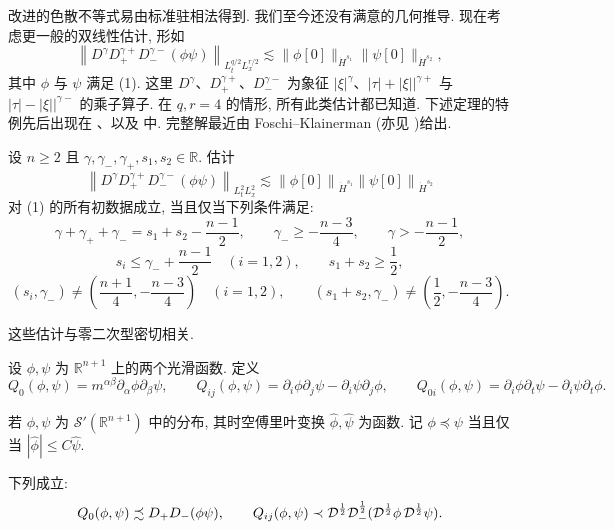改进的色散不等式易由标准驻相法得到. 我们至今还没有满意的几何推导.
现在考虑更一般的双线性估计, 形如
\[
\left\|D^{\gamma}D_{+}^{\gamma+}D_{-}^{\gamma-}\left(\phi\psi\right)\right\|_{L_{t}^{q/2}L_{x}^{r/2}}\lesssim\|\phi[0]\|_{\dot{H}^{s_{1}}}\|\psi[0]\|_{\dot{H}^{s_{2}}},
\]
其中 $\phi$ 与 $\psi$ 满足 (1). 这里 $D^\gamma$、$D_{+}^{\gamma+}$、$D_{-}^{\gamma-}$ 为象征 $|\xi|^\gamma$、$|\tau| + |\xi||^{\gamma+}$ 与 $|\tau| - |\xi||^{\gamma-}$ 的乘子算子. 在 $q, r = 4$ 的情形, 所有此类估计都已知道. 下述定理的特例先后出现在 \cite{klai31}、以及 \cite{klai37,klai44,klai39} 中. 完整解最近由 Foschi--Klainerman \cite{klai14}(亦见 \cite{klai69})给出.
\begin{proposition}\label{prop:1.16}
设 $n \geq 2$ 且 $\gamma, \gamma_{-}, \gamma_{+}, s_1, s_2 \in \mathbb{R}$. 估计
\[
\left\|D^{\gamma}D_{+}^{\gamma+}D_{-}^{\gamma-}\left(\phi\psi\right)\right\|_{L_{t}^{2}L_{x}^{2}}\lesssim\left\|\phi[0]\right\|_{\dot{H}^{s_{1}}}\left\|\psi[0]\right\|_{\dot{H}^{s_{2}}}
\]
对 (1) 的所有初数据成立, 当且仅当下列条件满足:
\[
\gamma+\gamma_{+}+\gamma_{-}=s_{1}+s_{2}-\frac{n-1}{2},\qquad
\gamma_{-}\geq-\frac{n-3}{4},\qquad
\gamma>-\frac{n-1}{2},
\]
\[
s_{i}\leq\gamma_{-}+\frac{n-1}{2}\quad (i=1,2),\qquad
s_{1}+s_{2}\geq\frac{1}{2},
\]
\[
\left(s_{i},\gamma_{-}\right)\neq\left(\frac{n+1}{4},-\frac{n-3}{4}\right)\quad (i=1,2),\qquad
\left(s_{1}+s_{2},\gamma_{-}\right)\neq\left(\frac{1}{2},-\frac{n-3}{4}\right).
\]
\end{proposition}

这些估计与零二次型密切相关.
\begin{definition}\label{def:1.17}
设 $\phi, \psi$ 为 $\mathbb{R}^{n+1}$ 上的两个光滑函数. 定义
\[
Q_{0}(\phi,\psi)=m^{\alpha\beta}\partial_{\alpha}\phi\partial_{\beta}\psi,\qquad
Q_{i j}(\phi,\psi)=\partial_{i}\phi\partial_{j}\psi-\partial_{i}\psi\partial_{j}\phi,\qquad
Q_{0i}(\phi,\psi)=\partial_{i}\phi\partial_{t}\psi-\partial_{i}\psi\partial_{t}\phi.
\]
\end{definition}

\begin{definition}\label{def:1.18}
若 $\phi, \psi$ 为 $\mathcal{S}'(\mathbb{R}^{n+1})$ 中的分布, 其时空傅里叶变换 $\widehat{\phi}, \widehat{\psi}$ 为函数. 记 $\phi \preceq \psi$ 当且仅当 $|\widehat{\phi}| \leq C\widehat{\psi}$.\end{definition}

\begin{lemma}\label{lem:1.19}
下列成立:
\[
Q_{0}(\phi,\psi)\precsim D_{+}D_{-}(\phi\psi),\qquad
Q_{i j}(\phi,\psi)\prec{\cal D}^{\frac{1}{2}}{\cal D}_{-}^{\frac{1}{2}}({\cal D}^{\frac{1}{2}}\phi\,{\cal D}^{\frac{1}{2}}\psi).
\]
\end{lemma}


